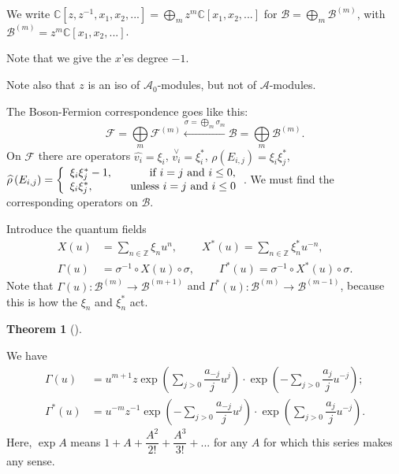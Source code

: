\documentclass
[numbers=enddot,12pt,final,onecolumn,german,notitlepage]{scrartcl}%
\theoremstyle{definition}
\newtheorem{theo}{Theorem}
\newenvironment{theorem}[1][]
{\begin{theo}[#1]\begin{leftbar}}
{\end{leftbar}\end{theo}}
\begin{document}
We write $\mathbb{C}\left[  z,z^{-1},x_{1},x_{2},...\right]  =\bigoplus
\limits_{m}z^{m}\mathbb{C}\left[  x_{1},x_{2},...\right]  $ for $\mathcal{B}%
=\bigoplus\limits_{m}\mathcal{B}^{\left(  m\right)  }$, with $\mathcal{B}%
^{\left(  m\right)  }=z^{m}\mathbb{C}\left[  x_{1},x_{2},...\right]  $.

Note that we give the $x$'es degree $-1$.

Note also that $z$ is an iso of $\mathcal{A}_{0}$-modules, but not of
$\mathcal{A}$-modules.

The Boson-Fermion correspondence goes like this:%
\[
\mathcal{F}=\bigoplus\limits_{m}\mathcal{F}^{\left(  m\right)  }%
\overset{\sigma=\bigoplus\limits_{m}\sigma_{m}}{\leftarrow}\mathcal{B}%
=\bigoplus\limits_{m}\mathcal{B}^{\left(  m\right)  }.
\]
On $\mathcal{F}$ there are operators $\widehat{v_{i}}=\xi_{i}$, $\overset{\vee
}{v_{i}}=\xi_{i}^{\ast}$, $\rho\left(  E_{i,j}\right)  =\xi_{i}\xi_{j}^{\ast}%
$, $\widehat{\rho}\left(  E_{i,j}\right)  =\left\{
\begin{array}
[c]{c}%
\xi_{i}\xi_{j}^{\ast}-1,\ \ \ \ \ \ \ \ \ \ \text{if }i=j\text{ and }i\leq0,\\
\xi_{i}\xi_{j}^{\ast},\ \ \ \ \ \ \ \ \ \ \text{unless }i=j\text{ and }i\leq0
\end{array}
\right.  $. We must find the corresponding operators on $\mathcal{B}$.

Introduce the quantum fields%
\begin{align*}
X\left(  u\right)   &  =\sum\limits_{n\in\mathbb{Z}}\xi_{n}u^{n}%
,\ \ \ \ \ \ \ \ \ \ X^{\ast}\left(  u\right)  =\sum\limits_{n\in\mathbb{Z}%
}\xi_{n}^{\ast}u^{-n},\\
\Gamma\left(  u\right)   &  =\sigma^{-1}\circ X\left(  u\right)  \circ
\sigma,\ \ \ \ \ \ \ \ \ \ \Gamma^{\ast}\left(  u\right)  =\sigma^{-1}\circ
X^{\ast}\left(  u\right)  \circ\sigma.
\end{align*}
Note that $\Gamma\left(  u\right)  :\mathcal{B}^{\left(  m\right)
}\rightarrow\mathcal{B}^{\left(  m+1\right)  }$ and $\Gamma^{\ast}\left(
u\right)  :\mathcal{B}^{\left(  m\right)  }\rightarrow\mathcal{B}^{\left(
m-1\right)  }$, because this is how the $\xi_{n}$ and $\xi_{n}^{\ast}$ act.

\begin{theorem}
\label{thm.euler}We have%
\begin{align*}
\Gamma\left(  u\right)   &  =u^{m+1}z\exp\left(  \sum\limits_{j>0}%
\dfrac{a_{-j}}{j}u^{j}\right)  \cdot\exp\left(  -\sum\limits_{j>0}\dfrac
{a_{j}}{j}u^{-j}\right)  ;\\
\Gamma^{\ast}\left(  u\right)   &  =u^{-m}z^{-1}\exp\left(  -\sum
\limits_{j>0}\dfrac{a_{-j}}{j}u^{j}\right)  \cdot\exp\left(  \sum
\limits_{j>0}\dfrac{a_{j}}{j}u^{-j}\right)  .
\end{align*}
Here, $\exp A$ means $1+A+\dfrac{A^{2}}{2!}+\dfrac{A^{3}}{3!}+...$ for any $A$
for which this series makes any sense.
\end{theorem}
\end{document}
